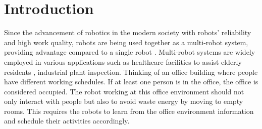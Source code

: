 





\chapter{Introduction}
Since the advancement of robotics in the modern society with robots' reliability and high work quality, robots are being used together as a multi-robot system, providing advantage compared to a single robot \cite{Eijyne2020DevelopmentOA}. 
Multi-robot systems are widely employed in various applications such as healthcare facilities to assist elderly residents \cite{retire2017}, industrial plant inspection\cite{Chun12}.
Thinking of an office building where people have different working schedules. If at least one person is in the office, the office is considered occupied. The robot working at this office environment should not only interact with people but also to avoid waste energy by moving to empty rooms. This requires the robots to learn from the office environment information and schedule their activities accordingly. 

